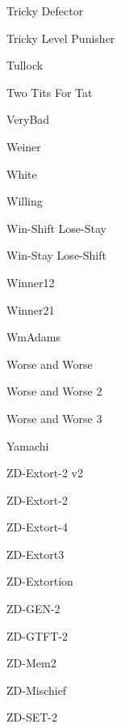 \item Tricky Defector~\cite{axelrodproject}
\item Tricky Level Punisher
\item Tullock~\cite{Axelrod1980a}
\item Two Tits For Tat~\cite{Axelrod1981}
\item VeryBad~\cite{Andre2013}
\item Weiner~\cite{Axelrod1980b}
\item White~\cite{Axelrod1980b}
\item Willing~\cite{Van2015}
\item Win-Shift Lose-Stay~\cite{Li2011}
\item Win-Stay Lose-Shift~\cite{Kraines1989, Nowak1993, Stewart2012}
\item Winner12~\cite{mathieu2017}
\item Winner21~\cite{mathieu2017}
\item WmAdams~\cite{Axelrod1980b}
\item Worse and Worse\cite{prison}
\item Worse and Worse 2\cite{prison}
\item Worse and Worse 3\cite{prison}
\item Yamachi~\cite{Axelrod1980b}
\item ZD-Extort-2 v2~\cite{Kuhn2017}
\item ZD-Extort-2~\cite{Stewart2012}
\item ZD-Extort-4~\cite{axelrodproject}
\item ZD-Extort3~\cite{axelrodproject}
\item ZD-Extortion~\cite{Roemheld2013}
\item ZD-GEN-2~\cite{Kuhn2017}
\item ZD-GTFT-2~\cite{Stewart2012}
\item ZD-Mem2~\cite{axelrodproject}
\item ZD-Mischief~\cite{Roemheld2013}
\item ZD-SET-2~\cite{Kuhn2017}